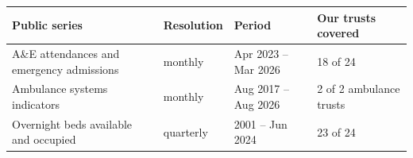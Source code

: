 \begin{tabular}{llll}
\toprule
Public series & Resolution & Period & Our trusts covered \\
\midrule
A\&E attendances and emergency admissions & monthly & Apr 2023 -- Mar 2026 & 18 of 24 \\
Ambulance systems indicators & monthly & Aug 2017 -- Aug 2026 & 2 of 2 ambulance trusts \\
Overnight beds available and occupied & quarterly & 2001 -- Jun 2024 & 23 of 24 \\
\bottomrule
\end{tabular}
